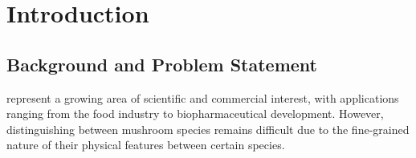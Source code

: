 \documentclass[journal,transmag]{IEEEtran}
\begin{document}
\maketitle


\IEEEdisplaynontitleabstractindextext







%
\IEEEpeerreviewmaketitle



\section{\textbf{Introduction}}
% 
% 
% 
% 
\subsection{Background and Problem Statement}

 represent a growing area of scientific and commercial interest, with applications ranging from the food industry to biopharmaceutical development\cite{mayirnao2025}. However, distinguishing between mushroom species remains difficult due to the fine-grained nature of their physical features between certain species\cite{sevindik2025}. 
\end{document}
